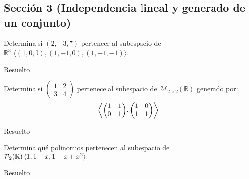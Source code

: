 
\subsection{Sección 3 (Independencia lineal y generado de un conjunto)}

\begin{exercise}{}{}
    Determina si $(2,-3,7)$ pertenece al subespacio de $\mathbb{R}^3 \, \, \langle (1,0,0), (1,-1,0), (1,-1,-1) \rangle$.

\begin{solution}{}{}
Resuelto
\end{solution}
\end{exercise}


\begin{exercise}{}{}
    Determina si $\begin{pmatrix}
        1 & 2 \\
        3 & 4
    \end{pmatrix}$ pertenece al subespacio de $\mathcal{M}_{2 \times 2}(\mathbb{R})$ generado por:
    \begin{align*}
        \biggl \langle{\begin{pmatrix}
            1 & 1 \\
            0 & 1
        \end{pmatrix}},{\begin{pmatrix}
            1 & 0 \\
            1 & 1
        \end{pmatrix}} \biggr \rangle 
    \end{align*}

\begin{solution}{}{}
Resuelto
\end{solution}
\end{exercise}


\begin{exercise}{}{}
    Determina qué polinomios pertenecen al subespacio de $\mathcal{P}_2(\mathbb{R}) \mathinner{\langle{1, 1-x},{1-x+x^2}\rangle}$ 
\begin{solution}{}{}
Resuelto
\end{solution}
\end{exercise}

